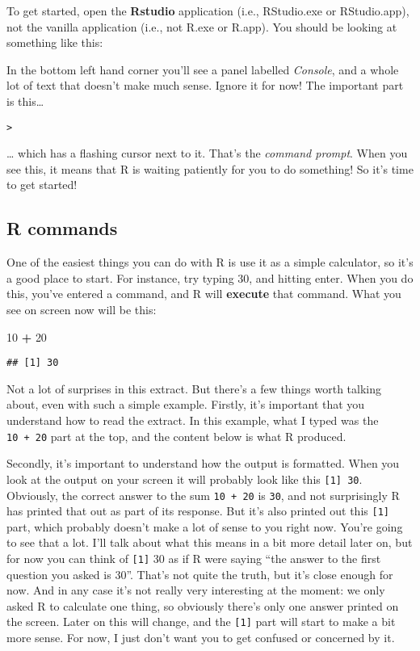 \documentclass[]{book}
\newenvironment{Shaded}{\begin{snugshade}}{\end{snugshade}}
\newcommand{\DecValTok}[1]{\textcolor[rgb]{0.00,0.00,0.81}{#1}}
\newcommand{\OperatorTok}[1]{\textcolor[rgb]{0.81,0.36,0.00}{\textbf{#1}}}
\newcommand{\StringTok}[1]{\textcolor[rgb]{0.31,0.60,0.02}{#1}}
\begin{document}
To get started, open the \textbf{Rstudio} application (i.e., RStudio.exe or RStudio.app), not the vanilla application (i.e., not R.exe or R.app). You should be looking at something like this:

In the bottom left hand corner you'll see a panel labelled \emph{Console}, and a whole lot of text that doesn't make much sense. Ignore it for now! The important part is this\ldots{}

\begin{verbatim}
>
\end{verbatim}

\ldots{} which has a flashing cursor next to it. That's the \emph{command prompt}. When you see this, it means that R is waiting patiently for you to do something! So it's time to get started!

\hypertarget{r-commands}{%
\subsection{R commands}\label{r-commands}}

One of the easiest things you can do with R is use it as a simple calculator, so it's a good place to start. For instance, try typing 30, and hitting enter. When you do this, you've entered a command, and R will \textbf{execute} that command. What you see on screen now will be this:

\begin{Shaded}
\begin{Highlighting}[]
\DecValTok{10} \OperatorTok{+}\StringTok{ }\DecValTok{20}
\end{Highlighting}
\end{Shaded}

\begin{verbatim}
## [1] 30
\end{verbatim}

Not a lot of surprises in this extract. But there's a few things worth talking about, even with such a simple example. Firstly, it's important that you understand how to read the extract. In this example, what I typed was the \texttt{10\ +\ 20} part at the top, and the content below is what R produced.

Secondly, it's important to understand how the output is formatted. When you look at the output on your screen it will probably look like this \texttt{{[}1{]}\ 30}. Obviously, the correct answer to the sum \texttt{10\ +\ 20} is \texttt{30}, and not surprisingly R has printed that out as part of its response. But it's also printed out this \texttt{{[}1{]}} part, which probably doesn't make a lot of sense to you right now. You're going to see that a lot. I'll talk about what this means in a bit more detail later on, but for now you can think of \texttt{{[}1{]}} 30 as if R were saying ``the answer to the first question you asked is 30''. That's not quite the truth, but it's close enough for now. And in any case it's not really very interesting at the moment: we only asked R to calculate one thing, so obviously there's only one answer printed on the screen. Later on this will change, and the \texttt{{[}1{]}} part will start to make a bit more sense. For now, I just don't want you to get confused or concerned by it.
\end{document}
